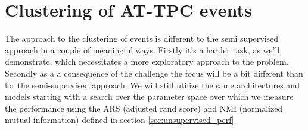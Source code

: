 \chapter{Clustering of AT-TPC events}

The approach to the clustering of events is different to the semi supervised approach in a couple of meaningful ways. Firstly it's a harder task, as we'll demonstrate, which necessitates a more exploratory approach to the problem. Secondly as a a consequence of the challenge the focus will be a bit different than for the semi-supervised approach. We will still utilize the same architectures and models starting with a search over the parameter space over which we measure the performance using the ARS (adjusted rand score) and NMI (normalized mutual information) defined in section \ref{sec:unsupervised_perf}